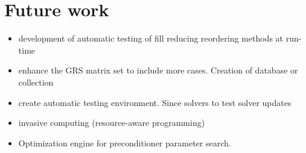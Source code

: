 \section{Future work}
\label{subseq:part-2-future-work}

\begin{itemize}

	\item development of automatic testing of fill reducing reordering methods at run-time

	\item enhance the GRS matrix set to include more cases. Creation of database or collection
	
	\item create automatic testing environment. Since solvers to test solver updates

	\item invasive computing (resource-aware programming)
		
			\item Optimization engine for preconditioner parameter search.

	
\end{itemize}


